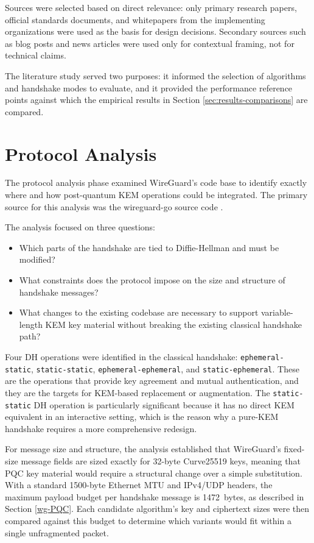 Sources were selected based on direct relevance: only primary research papers, official standards documents, and whitepapers from the implementing organizations were used as the basis for design decisions. Secondary sources such as blog posts and news articles were used only for contextual framing, not for technical claims. 

The literature study served two purposes: it informed the selection of algorithms and handshake modes to evaluate, and it provided the performance reference points against which the empirical results in Section \ref{sec:results-comparisons} are compared.


\section{Protocol Analysis}\label{protocol}
The protocol analysis phase examined WireGuard's code base to identify exactly where and how post-quantum KEM operations could be integrated. The primary source for this analysis was the wireguard-go source code \cite{wireguardgo}.

The analysis focused on three questions:
\begin{itemize}
    \item Which parts of the handshake are tied to Diffie-Hellman and must be modified?
    \item What constraints does the protocol impose on the size and structure of handshake messages?
    \item What changes to the existing codebase are necessary to support variable-length KEM key material without breaking the existing classical handshake path?
\end{itemize}

Four DH operations were identified in the classical handshake: \texttt{ephemeral-static}, \texttt{static-static}, \texttt{ephemeral-ephemeral}, and \texttt{static-ephemeral}. These are the operations that provide key agreement and mutual authentication, and they are the targets for KEM-based replacement or augmentation. The \texttt{static-static} DH operation is particularly significant because it has no direct KEM equivalent in an interactive setting, which is the reason why a pure-KEM handshake requires a more comprehensive redesign.

For message size and structure, the analysis established that WireGuard's fixed-size message fields are sized exactly for 32-byte Curve25519 keys, meaning that PQC key material would require a structural change over a simple substitution. With a standard 1500-byte Ethernet MTU and IPv4/UDP headers, the maximum payload budget per handshake message is \qty{1472}{bytes}, as described in Section \ref{wg-PQC}. Each candidate algorithm's key and ciphertext sizes were then compared against this budget to determine which variants would fit within a single unfragmented packet.

